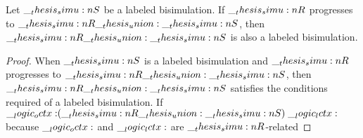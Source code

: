 


\begin{lemma}\label{lem:labeled-bisim-union}
  Let $\__thesis_simu:n {S}$ be a labeled bisimulation.
  If $\__thesis_simu:n {R}$ progresses to $\__thesis_simu:n {R} \__thesis_union: \__thesis_simu:n {S}$, then $\__thesis_simu:n {R} \__thesis_union: \__thesis_simu:n {S}$ is also a labeled bisimulation.
\end{lemma}
\begin{proof}
  When $\__thesis_simu:n {S}$ is a labeled bisimulation and $\__thesis_simu:n {R}$ progresses to $\__thesis_simu:n {R} \__thesis_union: \__thesis_simu:n {S}$, then $\__thesis_simu:n {R} \__thesis_union: \__thesis_simu:n {S}$ satisfies the conditions required of a labeled bisimulation.
  If $\__logic_octx: \mathrel{(\__thesis_simu:n {R} \__thesis_union: \__thesis_simu:n {S})} \__logic_lctx:$ because $\__logic_octx:$ and $\__logic_lctx:$ are $\__thesis_simu:n {R}$-related
\end{proof}


